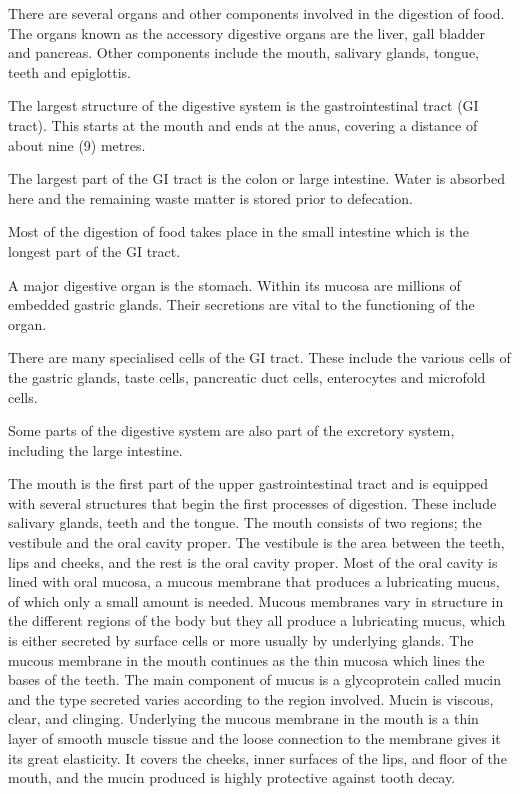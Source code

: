 There are several organs and other components involved in the digestion of food. The organs known as the accessory digestive organs are the liver, gall bladder and pancreas. Other components include the mouth, salivary glands, tongue, teeth and epiglottis.

The largest structure of the digestive system is the gastrointestinal tract (GI tract). This starts at the mouth and ends at the anus, covering a distance of about nine (9) metres.

The largest part of the GI tract is the colon or large intestine. Water is absorbed here and the remaining waste matter is stored prior to defecation.

Most of the digestion of food takes place in the small intestine which is the longest part of the GI tract.

A major digestive organ is the stomach. Within its mucosa are millions of embedded gastric glands. Their secretions are vital to the functioning of the organ.

There are many specialised cells of the GI tract. These include the various cells of the gastric glands, taste cells, pancreatic duct cells, enterocytes and microfold cells.

Some parts of the digestive system are also part of the excretory system, including the large intestine.

The mouth is the first part of the upper gastrointestinal tract and is equipped with several structures that begin the first processes of digestion. These include salivary glands, teeth and the tongue. The mouth consists of two regions; the vestibule and the oral cavity proper. The vestibule is the area between the teeth, lips and cheeks, and the rest is the oral cavity proper. Most of the oral cavity is lined with oral mucosa, a mucous membrane that produces a lubricating mucus, of which only a small amount is needed. Mucous membranes vary in structure in the different regions of the body but they all produce a lubricating mucus, which is either secreted by surface cells or more usually by underlying glands. The mucous membrane in the mouth continues as the thin mucosa which lines the bases of the teeth. The main component of mucus is a glycoprotein called mucin and the type secreted varies according to the region involved. Mucin is viscous, clear, and clinging. Underlying the mucous membrane in the mouth is a thin layer of smooth muscle tissue and the loose connection to the membrane gives it its great elasticity. It covers the cheeks, inner surfaces of the lips, and floor of the mouth, and the mucin produced is highly protective against tooth decay.

